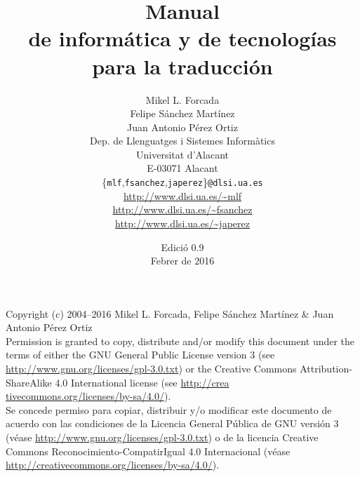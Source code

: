 \documentclass[11pt,a4paper]{book} \usepackage[spanish]{babel} \usepackage[utf8]{inputenc}
\begin{document}
 \frontmatter

\title{\bf Manual \\ de informática y de tecnologías\\ para la traducción} 

\author{Mikel L. Forcada\\Felipe Sánchez Martínez\\Juan Antonio Pérez Ortiz\\[2ex] Dep. de Llenguatges i Sistemes Informàtics\\ Universitat d'Alacant\\ E-03071 Alacant\\[2ex] \{\texttt{mlf},\texttt{fsanchez},\texttt{japerez}\}\texttt{@dlsi.ua.es} \\[2ex] \url{http://www.dlsi.ua.es/~mlf} \\ \url{http://www.dlsi.ua.es/~fsanchez} \\ \url{http://www.dlsi.ua.es/~japerez} } \date{Edició 0.9\\ Febrer de 2016} \maketitle

\newpage

\noindent Copyright (c) 2004--2016 Mikel L. Forcada, Felipe Sánchez Martínez \& Juan Antonio Pérez Ortiz \\[0.3cm] 

\noindent Permission is granted to copy, distribute and/or modify this document under the terms of either the GNU General Public License version 3 (see \url{http://www.gnu.org/licenses/gpl-3.0.txt}) or the Creative Commons Attribution-ShareAlike 4.0 International license (see \url{http://crea} \url{tivecommons.org/licenses/by-sa/4.0/}). \\[0.3cm] 

\noindent Se concede permiso para copiar, distribuir y/o modificar este documento de acuerdo con las condiciones de la Licencia General Pública de GNU versión 3 (véase \url{http://www.gnu.org/licenses/gpl-3.0.txt}) o de la licencia Creative Commons Reconocimiento-CompatirIgual 4.0 Internacional (véase \url{http://creativecommons.org/licenses/by-sa/4.0/}). 

\maketitle
\end{document}
